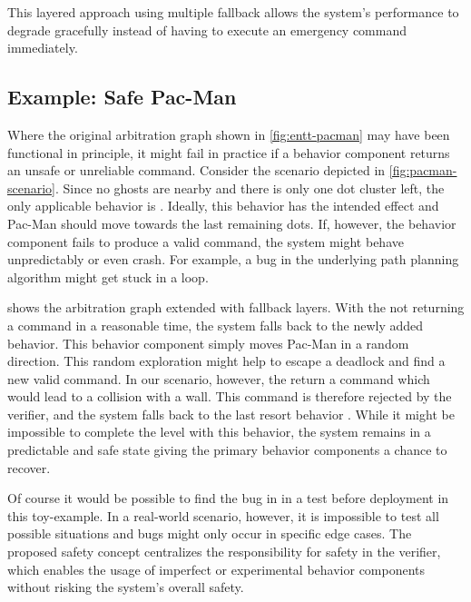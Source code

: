 This layered approach using multiple fallback allows the system's performance to degrade gracefully instead of having to execute an emergency command immediately.

\subsection{Example: Safe Pac-Man}

Where the original arbitration graph shown in \cref{fig:entt-pacman} may have been functional in principle, it might fail in practice if a behavior component returns an unsafe or unreliable command.
Consider the scenario depicted in \cref{fig:pacman-scenario}.
Since no ghosts are nearby and there is only one dot cluster left, the only applicable behavior is .
Ideally, this behavior has the intended effect and Pac-Man should move towards the last remaining dots.
If, however, the behavior component fails to produce a valid command, the system might behave unpredictably or even crash.
For example, a bug in the underlying path planning algorithm might get stuck in a loop.

 shows the arbitration graph extended with fallback layers.
With the  not returning a command in a reasonable time, the system falls back to the newly added  behavior.
This behavior component simply moves Pac-Man in a random direction.
This random exploration might help to escape a deadlock and find a new valid command.
In our scenario, however, the  return a command which would lead to a collision with a wall.
This command is therefore rejected by the verifier, and the system falls back to the last resort behavior .
While it might be impossible to complete the level with this behavior, the system remains in a predictable and safe state giving the primary behavior components a chance to recover.

Of course it would be possible to find the bug in  in a test before deployment in this toy-example.
In a real-world scenario, however, it is impossible to test all possible situations and bugs might only occur in specific edge cases.
The proposed safety concept centralizes the responsibility for safety in the verifier, which enables the usage of imperfect or experimental behavior components without risking the system's overall safety.

